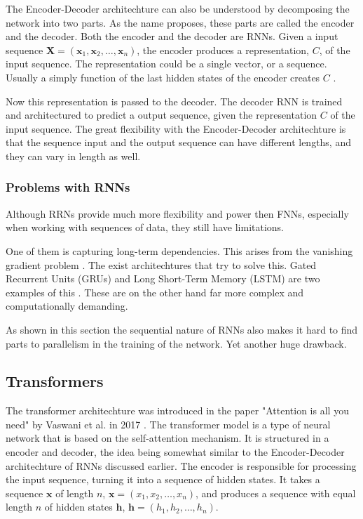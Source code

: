 The Encoder-Decoder architechture can also be understood by decomposing the network into two parts.
As the name proposes, these parts are called  the encoder and the decoder. Both the 
encoder and the decoder are RNNs.
Given a input sequence $\textbf{X} = (\textbf{x}_1, \textbf{x}_2, \dots ,\textbf{x}_n)$, 
the encoder produces a representation, $C$, of the input sequence. The representation 
could be a single vector, or a sequence. 
Usually a simply function of the last hidden states of the encoder creates $C$ \cite{Goodfellow-et-al-2016}.

Now this representation is passed to the decoder. The decoder 
RNN is trained and architectured to predict a output sequence,
given the representation $C$ of the input sequence.  The great flexibility with the Encoder-Decoder architechture is that
the sequence input and the output sequence can have different lengths,
and they can vary in length as well. 

\subsubsection{Problems with RNNs}

Although RRNs provide much more flexibility and power then FNNs, especially
when working with sequences of data, they still have limitations.

One of them is capturing long-term dependencies. This arises from the 
vanishing gradient problem \cite{MHJ_lecture_notes_W1}. 
The exist architechtures that try to solve this. 
Gated Recurrent Units (GRUs) and Long Short-Term Memory (LSTM) are two examples of this \cite{Goodfellow-et-al-2016}.
These are on the other hand far more complex and computationally demanding.

As shown in this section the sequential nature of RNNs also
makes it hard to find parts to parallelism in the training of the network. Yet another 
huge drawback.


\subsection{Transformers}

The transformer architechture was introduced in the paper 
"Attention is all you need" by Vaswani et al. in 2017 \cite{vaswani2023attention}.
The transformer model is a type of neural network that is based on the self-attention mechanism.
It is structured in a encoder and decoder, the idea being somewhat similar to the Encoder-Decoder architechture of RNNs discussed earlier.
The encoder is responsible for processing the input sequence, turning it into a sequence of hidden states.
It takes a sequence $\textbf{x}$ of length $n$, $\textbf{x} = (x_1, x_2, \dots, x_n)$,
and produces a sequence with equal length $n$ of hidden states $\textbf{h}$, $\textbf{h} = (h_1, h_2, \dots, h_n)$.

